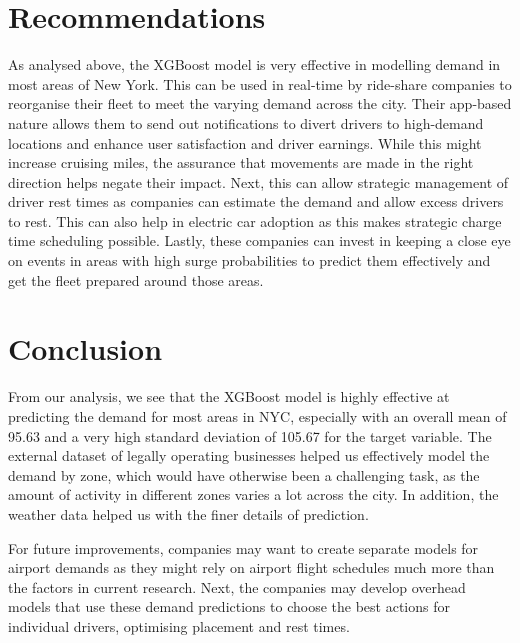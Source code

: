 \documentclass[11pt]{article}
\begin{document}
\section{Recommendations}
As analysed above, the XGBoost model is very effective in modelling demand in most areas of New York. This can be used in real-time by ride-share companies to reorganise their fleet to meet the varying demand across the city. Their app-based nature allows them to send out notifications to divert drivers to high-demand locations and enhance user satisfaction and driver earnings. While this might increase cruising miles, the assurance that movements are made in the right direction helps negate their impact. Next, this can allow strategic management of driver rest times as companies can estimate the demand and allow excess drivers to rest. This can also help in electric car adoption as this makes strategic charge time scheduling possible. Lastly, these companies can invest in keeping a close eye on events in areas with high surge probabilities to predict them effectively and get the fleet prepared around those areas.

\section{Conclusion}
From our analysis, we see that the XGBoost model is highly effective at predicting the demand for most areas in NYC, especially with an overall mean of 95.63 and a very high standard deviation of 105.67 for the target variable. The external dataset of legally operating businesses helped us effectively model the demand by zone, which would have otherwise been a challenging task, as the amount of activity in different zones varies a lot across the city. In addition, the weather data helped us with the finer details of prediction.

For future improvements, companies may want to create separate models for airport demands as they might rely on airport flight schedules much more than the factors in current research. Next, the companies may develop overhead models that use these demand predictions to choose the best actions for individual drivers, optimising placement and rest times.


\clearpage

\printbibliography
\clearpage
\end{document}
